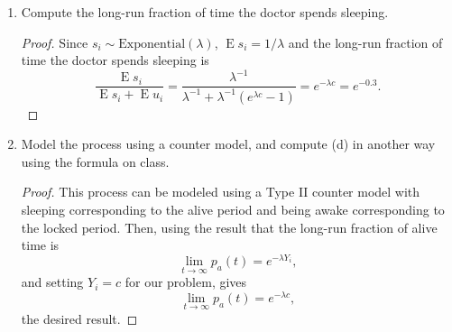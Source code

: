\documentclass[oneside]{amsart}
\DeclareMathOperator{\E}{\mathrm{E}}
\newcommand{\Exp}{\mathrm{Exponential}}
\theoremstyle{definition}
\begin{document}
\begin{enumerate}[label=(\alph*)]
\begin{proof}
We have 
\[
	\E u_i = \frac{e^{\lambda c} -1}{\lambda} 
	=\frac{e^{0.5 \cdot 0.6} -1}{0.6} 
	= 2(e^{0.3} - 1).
\]
\end{proof}
\item
Compute the long-run fraction of time the doctor spends sleeping.
\begin{proof}
Since $s_i \sim \Exp(\lambda)$, $\E s_i = 1 / \lambda$ and the long-run fraction of time the doctor spends sleeping is 
\[
	\frac{\E s_i }{\E s_i + \E u_i} = \frac{\lambda^{-1}}{\lambda^{-1} + \lambda^{-1} (e^{\lambda c} - 1)}
	= e^{-\lambda c} 
	= e^{-0.3}.
\]
\end{proof}
\item
Model the process using a counter model, and compute (d) in another way using the formula on class.
\begin{proof}
This process can be modeled using a Type II counter model with sleeping corresponding to the alive period and being awake corresponding to the locked period. Then, using the result that the long-run fraction of alive time is 
\[
	\lim_{t\to \infty} p_a(t) = e^{-\lambda Y_i},
\]
and setting $Y_i = c$ for our problem, gives
\[
	\lim_{t\to \infty} p_a(t) = e^{-\lambda c},
\]
the desired result.
\end{proof}
\end{enumerate}
\end{document}
